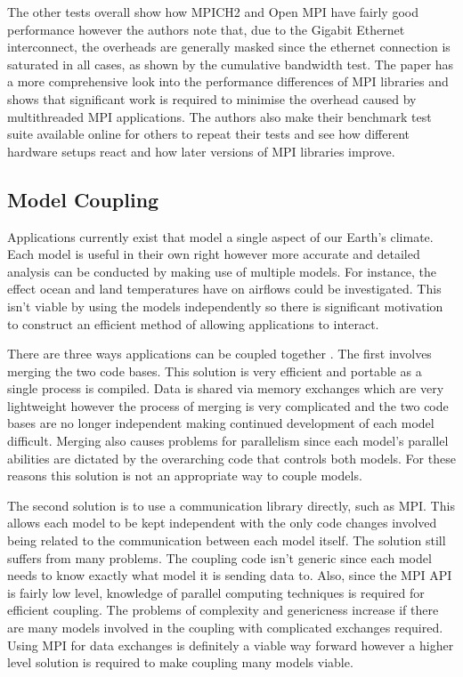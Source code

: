 \documentclass{acm_proc_article-sp}
\renewcommand{\_}{\underscore\hspace{0pt}}
\begin{document}
The other tests overall show how MPICH2 and Open MPI have fairly good
performance however the authors note that, due to the Gigabit Ethernet
interconnect, the overheads are generally masked since the ethernet connection
is saturated in all cases, as shown by the cumulative bandwidth test. The paper
has a more comprehensive look into the performance differences of MPI libraries
and shows that significant work is required to minimise the overhead caused by
multithreaded MPI applications. The authors also make their benchmark test suite
available online for others to repeat their tests and see how different hardware
setups react and how later versions of MPI libraries improve.

\subsection*{Model Coupling}

Applications currently exist that model a single aspect of our Earth's climate.
Each model is useful in their own right however more accurate and detailed
analysis can be conducted by making use of multiple models. For instance, the
effect ocean and land temperatures have on airflows could be investigated. This
isn't viable by using the models independently so there is significant
motivation to construct an efficient method of allowing applications to
interact.

There are three ways applications can be coupled together \cite{Thevenin}. The
first involves merging the two code bases. This solution is very efficient and
portable as a single process is compiled. Data is shared via memory exchanges
which are very lightweight however the process of merging is very complicated
and the two code bases are no longer independent making continued development of
each model difficult. Merging also causes problems for parallelism since each
model's parallel abilities are dictated by the overarching code that controls
both models. For these reasons this solution is not an appropriate way to couple
models.

The second solution \cite{Thevenin} is to use a communication library directly,
such as MPI. This allows each model to be kept independent with the only code
changes involved being related to the communication between each model itself.
The solution still suffers from many problems. The coupling code isn't generic
since each model needs to know exactly what model it is sending data to. Also,
since the MPI API is fairly low level, knowledge of parallel computing
techniques is required for efficient coupling. The problems of complexity and
genericness increase if there are many models involved in the coupling with
complicated exchanges required. Using MPI for data exchanges is definitely a
viable way forward however a higher level solution is required to make coupling
many models viable.
\end{document}
